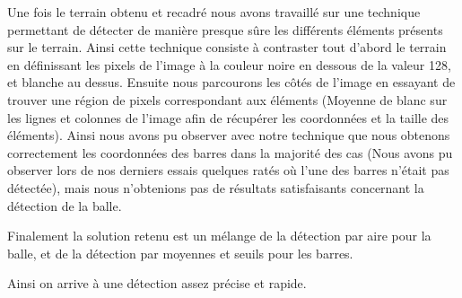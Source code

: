 \par Une fois le terrain obtenu et recadré nous avons travaillé sur une
technique permettant de détecter de manière presque sûre les différents éléments
présents sur le terrain. Ainsi cette technique consiste à contraster tout
d'abord le terrain en définissant les pixels de l'image à la couleur noire en
dessous de la valeur 128, et blanche au dessus. Ensuite nous parcourons les
côtés de l'image en essayant de trouver une région de pixels correspondant aux
éléments (Moyenne de blanc sur les lignes et colonnes de l'image afin de récupérer les
coordonnées et la taille des éléments). Ainsi nous avons pu observer avec notre
technique que nous obtenons correctement les coordonnées des barres dans la
majorité des cas (Nous avons pu observer lors de nos derniers essais quelques
ratés où l'une des barres n'était pas détectée), mais nous n'obtenions pas de
résultats satisfaisants concernant la détection de la balle.

\par Finalement la solution retenu est un mélange de la détection par aire pour
la balle, et de la détection par moyennes et seuils pour les barres.
\par Ainsi on arrive à une détection assez précise et rapide.
